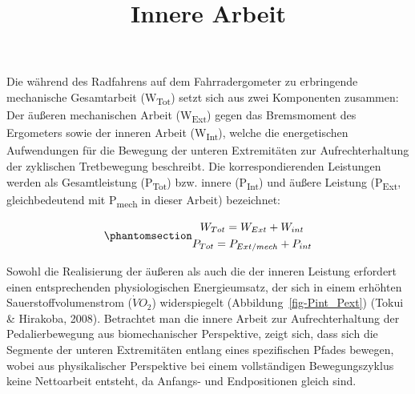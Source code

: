 \documentclass[
  letterpaper,
  DIV=11]{scrartcl}
\title{Innere Arbeit}
\author{}
\date{}
\begin{document}
\maketitle

Die während des Radfahrens auf dem Fahrradergometer zu erbringende
mechanische Gesamtarbeit (W\textsubscript{Tot}) setzt sich aus zwei
Komponenten zusammen: Der äußeren mechanischen Arbeit
(W\textsubscript{Ext}) gegen das Bremsmoment des Ergometers sowie der
inneren Arbeit (W\textsubscript{Int}), welche die energetischen
Aufwendungen für die Bewegung der unteren Extremitäten zur
Aufrechterhaltung der zyklischen Tretbewegung beschreibt. Die
korrespondierenden Leistungen werden als Gesamtleistung
(P\textsubscript{Tot}) bzw. innere (P\textsubscript{Int}) und äußere
Leistung (P\textsubscript{Ext}, gleichbedeutend mit
P\textsubscript{mech} in dieser Arbeit) bezeichnet:

\begin{equation}\phantomsection\label{eq-W_P-Tot}{
\begin{gathered}
W_{Tot} = W_{Ext} +  W_{int} \\
P_{Tot} = P_{Ext/mech} +  P_{int}
\end{gathered}
}\end{equation}

Sowohl die Realisierung der äußeren als auch die der inneren Leistung
erfordert einen entsprechenden physiologischen Energieumsatz, der sich
in einem erhöhten Sauerstoffvolumenstrom (\(\dot{V}O_{2}\))
widerspiegelt (Abbildung~\ref{fig-Pint_Pext}) (Tokui \& Hirakoba, 2008).
Betrachtet man die innere Arbeit zur Aufrechterhaltung der
Pedalierbewegung aus biomechanischer Perspektive, zeigt sich, dass sich
die Segmente der unteren Extremitäten entlang eines spezifischen Pfades
bewegen, wobei aus physikalischer Perspektive bei einem vollständigen
Bewegungszyklus keine Nettoarbeit entsteht, da Anfangs- und
Endpositionen gleich sind.
\end{document}
